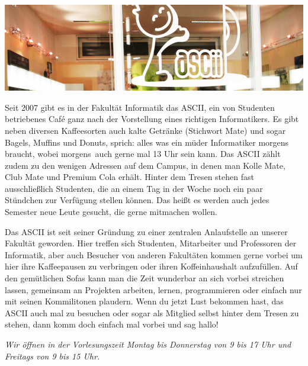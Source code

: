 
\includegraphics[width=\linewidth]{img/ascii.jpg}

Seit 2007 gibt es in der Fakultät Informatik das ASCII, ein von Studenten betriebenes Café ganz nach der Vorstellung eines richtigen Informatikers.
Es gibt neben diversen Kaffeesorten auch kalte Getränke (Stichwort Mate) und sogar Bagels, Muffins und Donuts, sprich:
alles was ein müder Informatiker morgens braucht, wobei \glqq morgens\grqq\ auch gerne mal 13 Uhr sein kann.
Das ASCII zählt zudem zu den wenigen Adressen auf dem Campus, in denen man Kolle Mate, Club Mate und Premium Cola erhält.
Hinter dem Tresen stehen fast ausschließlich Studenten, die an einem Tag in der Woche noch ein paar Stündchen zur Verfügung stellen können.
Das heißt es werden auch jedes Semester neue Leute gesucht, die gerne mitmachen wollen.

Das ASCII ist seit seiner Gründung zu einer zentralen Anlaufstelle an unserer Fakultät geworden.
Hier treffen sich Studenten, Mitarbeiter und Professoren der Informatik, aber auch Besucher von anderen Fakultäten kommen gerne vorbei um hier ihre Kaffeepausen zu verbringen oder ihren Koffeinhaushalt aufzufüllen.
Auf den gemütlichen Sofas kann man die Zeit wunderbar an sich vorbei streichen lassen, gemeinsam an Projekten arbeiten, lernen, programmieren oder einfach nur mit seinen Kommilitonen plaudern.
Wenn du jetzt Lust bekommen hast, das ASCII auch mal zu besuchen oder sogar als Mitglied selbst hinter dem Tresen zu stehen, dann komm doch einfach mal vorbei und sag hallo!

\textit{Wir öffnen in der Vorlesungszeit Montag bis Donnerstag von 9 bis 17 Uhr und Freitags von 9 bis 15 Uhr.}
